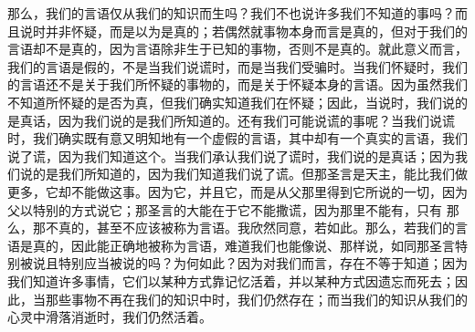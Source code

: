 那么，我们的言语仅从我们的知识而生吗？我们不也说许多我们不知道的事吗？而且说时并非怀疑，而是以为是真的；若偶然就事物本身而言是真的，但对于我们的言语却不是真的，因为言语除非生于已知的事物，否则不是真的。就此意义而言，我们的言语是假的，不是当我们说谎时，而是当我们受骗时。当我们怀疑时，我们的言语还不是关于我们所怀疑的事物的，而是关于怀疑本身的言语。因为虽然我们不知道所怀疑的是否为真，但我们确实知道我们在怀疑；因此，当说时，我们说的是真话，因为我们说的是我们所知道的。还有我们可能说谎的事呢？当我们说谎时，我们确实既有意又明知地有一个虚假的言语，其中却有一个真实的言语，我们说了谎，因为我们知道这个。当我们承认我们说了谎时，我们说的是真话；因为我们说的是我们所知道的，因为我们知道我们说了谎。但那圣言是天主，能比我们做更多，它却不能做这事。因为它，并且它，而是从父那里得到它所说的一切，因为父以特别的方式说它；那圣言的大能在于它不能撒谎，因为那里不能有，只有 那么，那不真的，甚至不应该被称为言语。我欣然同意，若如此。那么，若我们的言语是真的，因此能正确地被称为言语，难道我们也能像说、那样说，如同那圣言特别被说且特别应当被说的吗？为何如此？因为对我们而言，存在不等于知道；因为我们知道许多事情，它们以某种方式靠记忆活着，并以某种方式因遗忘而死去；因此，当那些事物不再在我们的知识中时，我们仍然存在；而当我们的知识从我们的心灵中滑落消逝时，我们仍然活着。\par

